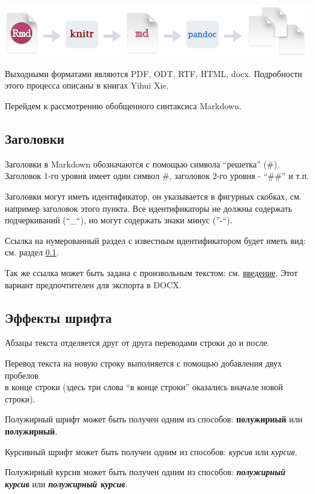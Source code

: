 \documentclass[
  a4paper,
]{book}
\theoremstyle{definition}
\theoremstyle{definition}
\theoremstyle{definition}
\theoremstyle{definition}
\theoremstyle{remark}
\begin{document}
\includegraphics{figures/Rmd.png}

Выходными форматами являются PDF, ODT, RTF, HTML, docx. Подробности этого процесса описаны в книгах Yihui Xie.

Перейдем к рассмотрению обобщенного синтаксиса Markdown.

\subsection{Заголовки}\label{markdown-syntax-head}

Заголовки в Markdown обозначаются с помощью символа ``решетка'' (\#). Заголовок 1-го уровня имеет один символ \#, заголовок 2-го уровня - ``\#\#'' и т.п.

Заголовки могут иметь идентификатор, он указывается в фигурных скобках, см. например заголовок этого пункта. Все идентификаторы не должны содержать подчеркиваний (``\_``), но могут содержать знаки минус (''-``).

Ссылка на нумерованный раздел с известным идентификатором будет иметь вид: см. раздел \ref{markdown-syntax-head}.

Так же ссылка может быть задана с произвольным текстом: см. \hyperref[intro]{введение}. Этот вариант предпочтителен для экспорта в DOCX.

\subsection{Эффекты шрифта}\label{markdown-syntax-style}

Абзацы текста отделяется друг от друга переводами строки до и после.

Перевод текста на новую строку выполняется с помощью добавления двух пробелов\\
в конце строки (здесь три слова ``в конце строки'' оказались вначале новой строки).

Полужирный шрифт может быть получен одним из способов: \textbf{полужирный} или \textbf{полужирный}.

Курсивный шрифт может быть получен одним из способов: \emph{курсив} или \emph{курсив}.

Полужирный курсив может быть получен одним из способов: \textbf{\emph{полужирный курсив}} или \textbf{\emph{полужирный курсив}}.
\end{document}
